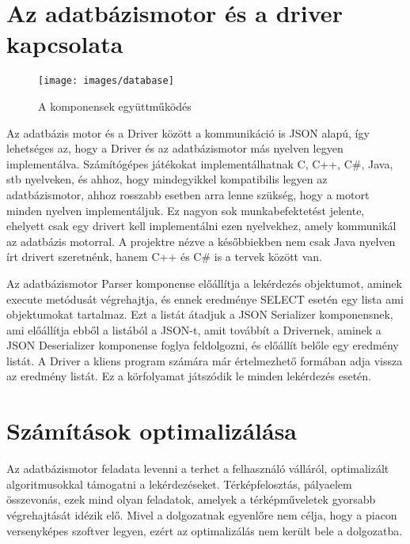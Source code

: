 \section{Az adatbázismotor és a driver kapcsolata}

\begin{figure}[htb]
	\begin{center}
		\texttt{[image: images/database]}
		\caption{A komponensek együttműködés}
		\label{fig:database}
	\end{center}
\end{figure}

Az adatbázis motor és a Driver között a kommunikáció is JSON alapú, így lehetséges az, hogy a Driver és az adatbázismotor más nyelven legyen implementálva. Számítógépes játékokat implementálhatnak C, C++, C#, Java, stb nyelveken, és ahhoz, hogy mindegyikkel kompatibilis legyen az adatbázismotor, ahhoz rosszabb esetben arra lenne szükség, hogy a motort minden nyelven implementáljuk. Ez nagyon sok munkabefektetést jelente, ehelyett csak egy drivert kell implementálni ezen nyelvekhez, amely kommunikál az adatbázis motorral. A projektre nézve a későbbiekben nem csak Java nyelven írt drivert szeretnénk, hanem C++ és C# is a tervek között van.

Az adatbázismotor Parser komponense előállítja a lekérdezés objektumot, aminek execute metódusát végrehajtja, és ennek eredménye SELECT esetén egy lista ami objektumokat tartalmaz. Ezt a listát átadjuk a JSON Serializer komponensnek, ami előállítja ebből a listából a JSON-t, amit továbbít a Drivernek, aminek a JSON Deserializer komponense foglya feldolgozni, és előállít belőle egy eredmény listát. A Driver a kliens program számára már értelmezhető formában adja vissza az eredmény listát. Ez a körfolyamat játszódik le minden lekérdezés esetén.

\section{Számítások optimalizálása}

Az adatbázismotor feladata levenni a terhet a felhasználó válláról, 
optimalizált algoritmusokkal támogatni a lekérdezéseket. Térképfelosztás, pályaelem összevonás, ezek mind olyan feladatok,
amelyek a térképműveletek gyorsabb végrehajtását idézik elő.
Mivel a dolgozatnak egyenlőre nem célja, hogy a piacon versenyképes szoftver legyen, ezért az optimalizálás nem került bele a dolgozatba.